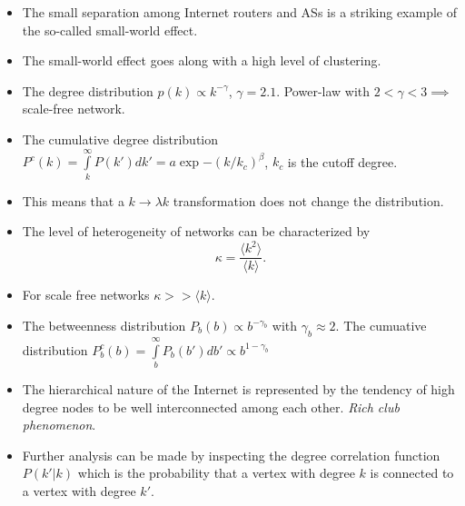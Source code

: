 \documentclass[11pt, a4paper]{article}
\begin{document}
\begin{itemize}
    \item The small separation among Internet routers and ASs is a striking example of the so-called small-world effect.
    \item The small-world effect goes along with a high level of clustering.
    \item The degree distribution $p(k) \propto k^{-\gamma}$, $\gamma = 2.1$. Power-law with $2 < \gamma < 3 \implies$ scale-free network.
    \item The cumulative degree distribution $P^c(k) = \int\limits_k^{\infty}P(k')dk' = a\exp{-(k/k_c)^{\beta}}$, $k_c$ is the cutoff degree.
    \item This means that a $k \rightarrow \lambda k$ transformation does not change the distribution.
    \item The level of heterogeneity of networks can be characterized by
    \begin{equation*}
        \kappa = \frac{\langle k^2\rangle}{\langle k\rangle}.
    \end{equation*}
    \item For scale free networks $\kappa >> \langle k \rangle$.
    \item The betweenness distribution $P_b(b) \propto b^{-\gamma_b}$ with $\gamma_b \approx 2$. The cumuative distribution $P_b^c(b) = \int\limits_b^{\infty}P_b(b')db'\propto b^{1-\gamma_b}$
    \item The hierarchical nature of the Internet is represented by the tendency of high degree nodes to be well interconnected among each other. \textit{Rich club phenomenon}.
    \item Further analysis can be made by inspecting the degree correlation function $P(k'|k)$ which is the probability that a vertex with degree $k$ is 
    connected to a vertex with degree $k'$.
\end{itemize}
\end{document}
